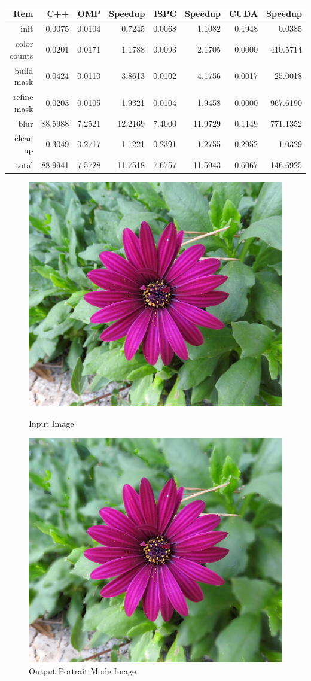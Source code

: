 \documentclass[12pt]{article}
\begin{document}
\begin{tabular}{r|r|r|r|r|r|r|r}
    Item & C++ & OMP & Speedup & ISPC & Speedup & CUDA & Speedup
\\  \hline
    init & 0.0075 & 0.0104 & 0.7245 & 0.0068 & 1.1082 & 0.1948 & 0.0385
\\  color counts & 0.0201 & 0.0171 & 1.1788 & 0.0093 & 2.1705 & 0.0000 & 410.5714
\\  build mask & 0.0424 & 0.0110 & 3.8613 & 0.0102 & 4.1756 & 0.0017 & 25.0018
\\  refine mask & 0.0203 & 0.0105 & 1.9321 & 0.0104 & 1.9458 & 0.0000 & 967.6190
\\  blur & 88.5988 & 7.2521 & 12.2169 & 7.4000 & 11.9729 & 0.1149 & 771.1352
\\  clean up & 0.3049 & 0.2717 & 1.1221 & 0.2391 & 1.2755 & 0.2952 & 1.0329
\\  \hline
    total & 88.9941 & 7.5728 & 11.7518 & 7.6757 & 11.5943 & 0.6067 & 146.6925
\end{tabular}

\begin{figure}[!htb]
    \begin{minipage}{0.48\textwidth}
        \centering
        \includegraphics[width=0.75\linewidth]{purp.jpg}
        \caption{Input Image}
    \end{minipage}\hfill
    \begin{minipage}{0.48\textwidth}
        \centering
        \includegraphics[width=0.75\linewidth]{purp_portrait.jpg}
        \caption{Output Portrait Mode Image}
    \end{minipage}\hfill
\end{figure}
\end{document}
